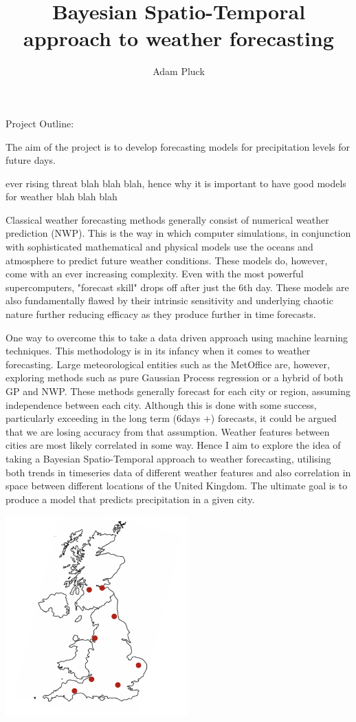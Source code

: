 \documentclass[13pt]{article}
\title{\vspace{-2.0cm}Bayesian Spatio-Temporal approach to weather forecasting\vspace{-2ex}}
\author{\vspace{-5.0cm}Adam Pluck\vspace{-3ex}}
\date{\vspace{-2ex}}
\begin{document}
\maketitle



Project Outline:

The aim of the project is to develop forecasting models for precipitation levels for future days. 


ever rising threat blah blah blah, hence why it is important to have good models for weather blah blah blah


Classical weather forecasting methods generally consist of numerical weather prediction (NWP). This is the way in which computer simulations, in conjunction with sophisticated mathematical and physical models use the oceans and atmosphere to predict future weather conditions. These models do, however, come with an ever increasing complexity. Even with the most powerful supercomputers, "forecast skill" drops off after just the 6th day. These models are also fundamentally flawed by their intrinsic sensitivity and underlying chaotic nature further reducing efficacy as they produce further in time forecasts.

One way to overcome this to take a data driven approach using machine learning techniques. This methodology is in its infancy when it comes to weather forecasting. Large meteorological entities such as the MetOffice are, however, exploring methods such as pure Gaussian Process regression or a hybrid of both GP and NWP. These methods generally forecast for each city or region, assuming independence between each city. Although this is done with some success, particularly exceeding in the long term (6days +) forecasts, it could be argued that we are losing accuracy from that assumption. Weather features between cities are most likely correlated in some way. Hence I aim to explore the idea of taking a Bayesian Spatio-Temporal approach to weather forecasting, utilising both trends in timeseries data of different weather features and also correlation in space between different locations of the United Kingdom. The ultimate goal is to produce a model that predicts precipitation in a given city.







\begin{center}
    \includegraphics[width=70mm, scale=0.5]{images/ukMap.png}    
\end{center}
\end{document}
